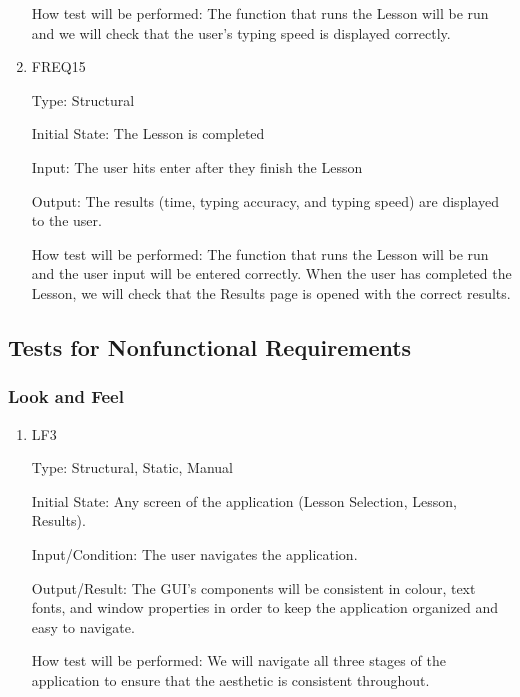\documentclass[12pt, titlepage]{article}
\begin{document}
\begin{enumerate}
How test will be performed:  The function that runs the Lesson will be run and we will check that the user's typing speed is displayed correctly.  

\item{FREQ15\\}
{\color{cyan}
Type: Structural
					
Initial State: The Lesson is completed
					
Input: The user hits enter after they finish the Lesson
					
Output: The results (time, typing accuracy, and typing speed) are displayed to the user.
		
How test will be performed: The function that runs the Lesson will be run and the user input will be entered correctly. When the user has completed the Lesson, we will check that the Results page is opened with the correct results.}

\end{enumerate}

\subsection{Tests for Nonfunctional Requirements}

\subsubsection{Look and Feel}

\begin{enumerate}

\item{{\color{cyan}LF3}}

Type: Structural, Static, Manual
					
Initial State: Any screen of the application (Lesson Selection, Lesson, Results).
					
Input/Condition: The user navigates the application.
					
Output/Result: The GUI's components will be consistent in colour, text fonts, and window properties in order to keep the application organized and easy to navigate.
					
How test will be performed: We will navigate all three stages of the application to ensure that the aesthetic is consistent throughout.

\end{enumerate}
\end{document}
